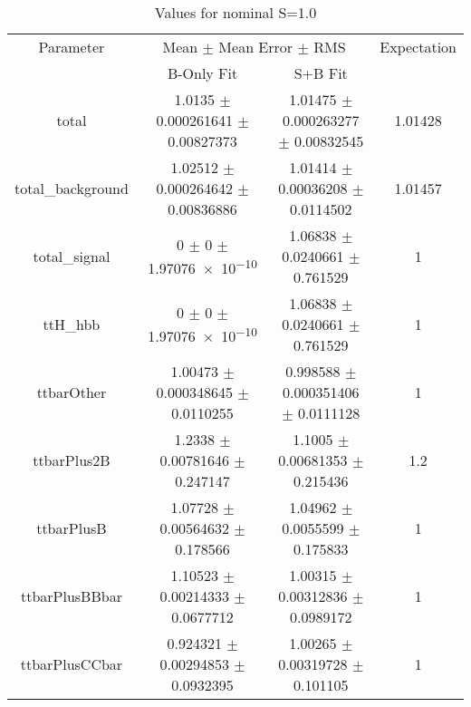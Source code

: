 \begin{table}
\centering
\caption{Values for nominal S=1.0}
\begin{tabular}{cccc}
\toprule
Parameter & \multicolumn{2}{c}{Mean $\pm$ Mean Error $\pm$ RMS} & Expectation\\
 & B-Only Fit & S+B Fit & \\
\midrule
total & \num{1.0135} $\pm$ \num{0.000261641} $\pm$ \num{0.00827373} & \num{1.01475} $\pm$ \num{0.000263277} $\pm$ \num{0.00832545} & \num{1.01428}\\
total\_background & \num{1.02512} $\pm$ \num{0.000264642} $\pm$ \num{0.00836886} & \num{1.01414} $\pm$ \num{0.00036208} $\pm$ \num{0.0114502} & \num{1.01457}\\
total\_signal & \num{0} $\pm$ \num{0} $\pm$ \num{1.97076e-10} & \num{1.06838} $\pm$ \num{0.0240661} $\pm$ \num{0.761529} & \num{1}\\
ttH\_hbb & \num{0} $\pm$ \num{0} $\pm$ \num{1.97076e-10} & \num{1.06838} $\pm$ \num{0.0240661} $\pm$ \num{0.761529} & \num{1}\\
ttbarOther & \num{1.00473} $\pm$ \num{0.000348645} $\pm$ \num{0.0110255} & \num{0.998588} $\pm$ \num{0.000351406} $\pm$ \num{0.0111128} & \num{1}\\
ttbarPlus2B & \num{1.2338} $\pm$ \num{0.00781646} $\pm$ \num{0.247147} & \num{1.1005} $\pm$ \num{0.00681353} $\pm$ \num{0.215436} & \num{1.2}\\
ttbarPlusB & \num{1.07728} $\pm$ \num{0.00564632} $\pm$ \num{0.178566} & \num{1.04962} $\pm$ \num{0.0055599} $\pm$ \num{0.175833} & \num{1}\\
ttbarPlusBBbar & \num{1.10523} $\pm$ \num{0.00214333} $\pm$ \num{0.0677712} & \num{1.00315} $\pm$ \num{0.00312836} $\pm$ \num{0.0989172} & \num{1}\\
ttbarPlusCCbar & \num{0.924321} $\pm$ \num{0.00294853} $\pm$ \num{0.0932395} & \num{1.00265} $\pm$ \num{0.00319728} $\pm$ \num{0.101105} & \num{1}\\
\bottomrule
\end{tabular}
\end{table}